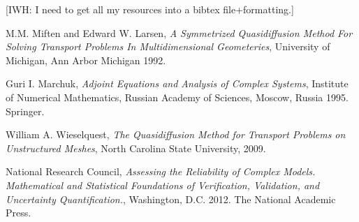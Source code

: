 \documentclass{article}
\begin{document}
{\color{red}[IWH: I need to get all my resources into a bibtex file+formatting.]}
\begin{thebibliography}{9}


  M.M. Miften and Edward W. Larsen, \emph{A Symmetrized Quasidiffusion Method For Solving Transport Problems In Multidimensional Geometeries}, University of Michigan, Ann Arbor Michigan 1992.
  
  
  Guri I. Marchuk, \emph{Adjoint Equations and Analysis of Complex Systems}, Institute of Numerical Mathematics, Russian Academy of Sciences, Moscow, Russia 1995. Springer.
  
  
  William A. Wieselquest, \emph{The Quasidiffusion Method for Transport Problems on Unstructured Meshes}, North Carolina State University, 2009.

  National Research Council, \emph{Assessing the Reliability of Complex Models. Mathematical and Statistical Foundations of Verification, Validation, and Uncertainty Quantification.}, Washington, D.C. 2012. The National Academic Press.


\end{thebibliography}


\end{document}
